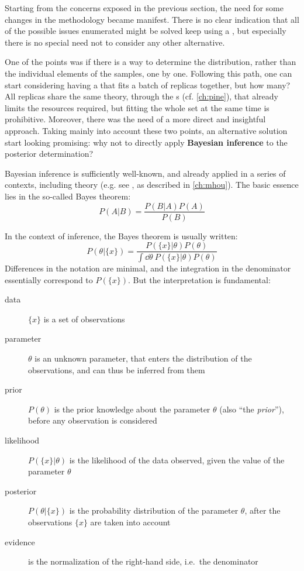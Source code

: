 
Starting from the concerns exposed in the previous section, the need for some
changes in the methodology became manifest.
%
There is no clear indication that all of the possible issues enumerated might
be solved keep using a \nn, but especially there is no special need not to
consider any other alternative.

One of the points was if there is a way to determine the distribution, rather
than the individual elements of the samples, one by one.
%
Following this path, one can start considering having a \nn that fits a batch
of replicas together, but how many?
%
All replicas share the same theory, through the \fktab{}s (cf. \cref{ch:pine}),
that already limits the resources required, but fitting the whole set at the
same time is prohibitive.
%
Moreover, there was the need of a more direct and insightful approach.
%
Taking mainly into account these two points, an alternative solution start
looking promising: why not to directly apply \textbf{Bayesian inference} to the
\pdf posterior determination?

Bayesian inference is sufficiently well-known, and already applied in a series
of contexts, including \hep theory (e.g. see \cite{Cacciari:2011ze}, as
described in \cref{ch:mhou}).
%
The basic essence lies in the so-called Bayes theorem:
\begin{equation}
  P(A|B) = \frac{P(B|A) P(A)}{P(B)}
  \label{eq:gp/bayes}
\end{equation}

In the context of inference, the Bayes theorem is usually written:
\begin{equation}
  P\left(\theta|\{x\}\right) = \frac{P\left(\{x\}|\theta\right) P\left(\theta\right)}{
    \int \dd\theta~ P\left(\{x\}|\theta\right) P\left(\theta\right)
  }
  \label{eq:gp/bayes-inf}
\end{equation}
Differences in the notation are minimal, and the integration in the denominator
essentially correspond to $P(\{x\})$.
%
But the interpretation is fundamental:
\begin{description}
  \item[data] $\{x\}$ is a set of observations
  \item[parameter] $\theta$ is an unknown parameter, that enters the
    distribution of the observations, and can thus be inferred from them
  \item[prior] $P(\theta)$ is the prior knowledge about the parameter $\theta$
    (also \enquote{the \textit{prior}}), before any observation is considered
  \item[likelihood] $P\left(\{x\}|\theta\right)$ is the likelihood of the data
    observed, given the value of the parameter $\theta$
  \item[posterior] $P\left(\theta|\{x\}\right)$ is the probability distribution
    of the parameter $\theta$, after the observations $\{x\}$ are taken into
    account
  \item[evidence] is the normalization of the right-hand side, i.e.\ the
    denominator
\end{description}

